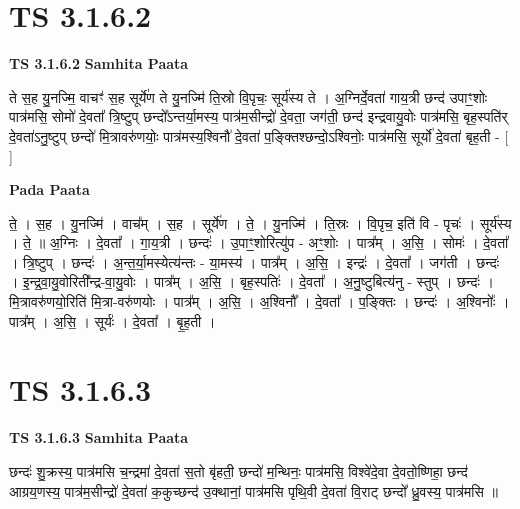\documentclass[17pt]{extarticle}
\begin{document}

\section{ TS 3.1.6.2 }

\textbf{TS 3.1.6.2 } \newline
\textbf{Samhita Paata} \newline

ते स॒ह यु॒नज्मि॒ वाचꣳ॑ स॒ह सूर्ये॑ण ते यु॒नज्मि॑ ति॒स्रो वि॒पृचः॒ सूर्य॑स्य ते । अ॒ग्निर्दे॒वता॑ गाय॒त्री छन्द॑ उपाꣳ॒॒शोः पात्र॑मसि॒ सोमो॑ दे॒वता᳚ त्रि॒ष्टुप् छन्दो᳚ऽन्तर्या॒मस्य॒ पात्र॑म॒सीन्द्रो॑ दे॒वता॒ जग॑ती॒ छन्द॑ इन्द्रवायु॒वोः पात्र॑मसि॒ बृह॒स्पति॑र् दे॒वता॑ऽनु॒ष्टुप् छन्दो॑ मि॒त्रावरु॑णयोः॒ पात्र॑मस्य॒श्विनौ॑ दे॒वता॑ प॒ङ्क्तिश्छन्दो॒ऽश्विनोः॒ पात्र॑मसि॒ सूर्यो॑ दे॒वता॑ बृह॒ती - [  ] \newline

\textbf{Pada Paata} \newline

ते॒ । स॒ह । यु॒नज्मि॑ । वाच᳚म् । स॒ह । सूर्ये॑ण । ते॒ । यु॒नज्मि॑ । ति॒स्रः । वि॒पृच॒ इति॑ वि - पृचः॑ । सूर्य॑स्य । ते॒ ॥ अ॒ग्निः । दे॒वता᳚ । गा॒य॒त्री । छन्दः॑ । उ॒पाꣳ॒॒शोरित्यु॑प - अꣳ॒॒शोः । पात्र᳚म् । अ॒सि॒ । सोमः॑ । दे॒वता᳚ । त्रि॒ष्टुप् । छन्दः॑ । अ॒न्त॒र्या॒मस्येत्य॑न्तः - या॒मस्य॑ । पात्र᳚म् । अ॒सि॒ । इन्द्रः॑ । दे॒वता᳚ । जग॑ती । छन्दः॑ । इ॒न्द्र॒वा॒यु॒वोरिती᳚न्द्र-वा॒यु॒वोः । पात्र᳚म् । अ॒सि॒ । बृह॒स्पतिः॑ । दे॒वता᳚ । अ॒नु॒ष्टुबित्य॑नु - स्तुप् । छन्दः॑ । मि॒त्रावरु॑णयो॒रिति॑ मि॒त्रा-वरु॑णयोः । पात्र᳚म् । अ॒सि॒ । अ॒श्विनौ᳚ । दे॒वता᳚ । प॒ङ्क्तिः । छन्दः॑ । अ॒श्विनोः᳚ । पात्र᳚म् । अ॒सि॒ । सूर्यः॑ । दे॒वता᳚ । बृ॒ह॒ती ।  \newline





\section{ TS 3.1.6.3 }

\textbf{TS 3.1.6.3 } \newline
\textbf{Samhita Paata} \newline

छन्दः॑ शु॒क्रस्य॒ पात्र॑मसि च॒न्द्रमा॑ दे॒वता॑ स॒तो बृ॑हती॒ छन्दो॑ म॒न्थिनः॒ पात्र॑मसि॒ विश्वे॑दे॒वा दे॒वतो॒ष्णिहा॒ छन्द॑ आग्रय॒णस्य॒ पात्र॑म॒सीन्द्रो॑ दे॒वता॑ क॒कुच्छन्द॑ उ॒क्थानां॒ पात्र॑मसि पृथि॒वी दे॒वता॑ वि॒राट् छन्दो᳚ ध्रु॒वस्य॒ पात्र॑मसि ॥ \newline
\end{document}
